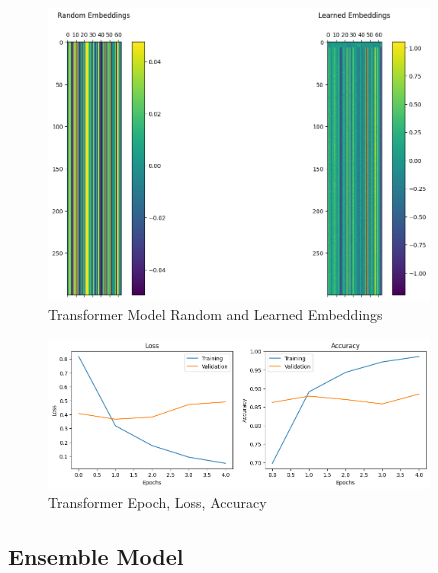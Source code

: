\begin{figure}[h!]  
    \centering
    \includegraphics[width=0.9\textwidth]{Images/T EMBED.png}  
    \caption{Transformer Model Random and Learned Embeddings}
    \label{lstm t embed}  %
\end{figure}

\begin{figure}[h!]  
    \centering
    \includegraphics[width=0.9\textwidth]{Images/T LOSS EPOCH.png}  
    \caption{Transformer Epoch, Loss, Accuracy}
    \label{lstm t epch}  %
\end{figure}


\pagebreak

\subsection{Ensemble Model}

